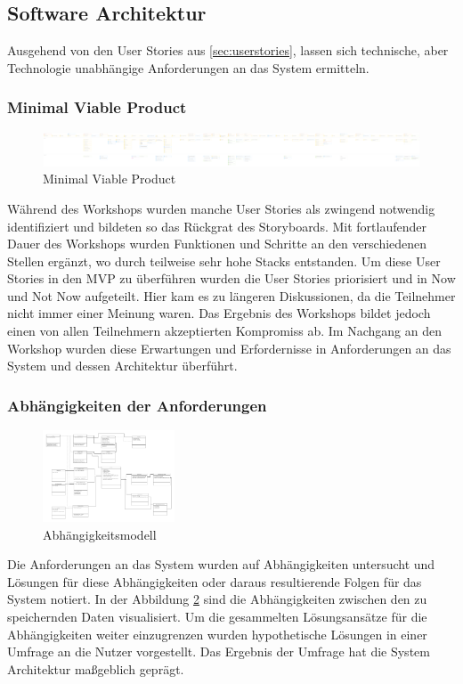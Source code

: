 \subsection{Software Architektur}
Ausgehend von den User Stories aus \ref{sec:userstories}, lassen sich technische, aber Technologie unabhängige Anforderungen an das System ermitteln. 

\subsubsection{Minimal Viable Product}
\begin{figure}[h] %
    \includegraphics[width=1\textwidth]{images/mvp.png}
    \caption[Minimal Viable Product]{Minimal Viable Product}
    \label{fig:mvp}
\end{figure}
Während des Workshops wurden manche User Stories als zwingend notwendig identifiziert und bildeten so das Rückgrat des Storyboards. Mit fortlaufender Dauer des Workshops wurden Funktionen und Schritte an den verschiedenen Stellen ergänzt, wo durch teilweise sehr hohe Stacks entstanden. Um diese User Stories in den MVP zu überführen wurden die User Stories priorisiert und in Now und Not Now aufgeteilt. Hier kam es zu längeren Diskussionen, da die Teilnehmer nicht immer einer Meinung waren. Das Ergebnis des Workshops bildet jedoch einen von allen Teilnehmern akzeptierten Kompromiss ab. Im Nachgang an den Workshop wurden diese Erwartungen und Erfordernisse in Anforderungen an das System und dessen Architektur überführt.\\

\subsubsection{Abhängigkeiten der Anforderungen}
\begin{figure}
    \centering
    \includegraphics[width=0.35\textwidth]{images/dependencymodell.png}
    \caption[Abhängigkeitsmodell]{Abhängigkeitsmodell}
    \label{fig:dependencymodell}
\end{figure}
Die Anforderungen an das System wurden auf Abhängigkeiten untersucht und Lösungen für diese Abhängigkeiten oder daraus resultierende Folgen für das System notiert. In der Abbildung \ref{fig:dependencymodell} sind die Abhängigkeiten zwischen den zu speichernden Daten visualisiert. Um die gesammelten Lösungsansätze für die Abhängigkeiten weiter einzugrenzen wurden hypothetische Lösungen in einer Umfrage an die Nutzer vorgestellt. Das Ergebnis der Umfrage hat die System Architektur maßgeblich geprägt.\\

